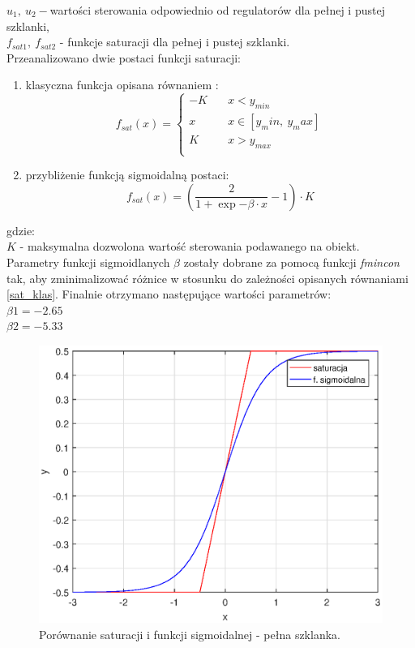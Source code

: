 $u_1, \ u_2 - $wartości sterowania odpowiednio od regulatorów dla pełnej i pustej szklanki,\\
$f_{sat1}, \ f_{sat2}$ - funkcje saturacji dla pełnej i pustej szklanki.
 \\
\newpage
 Przeanalizowano dwie postaci funkcji saturacji: 
 \begin{enumerate}
 	\item klasyczna funkcja opisana równaniem :
 	\begin{equation}\label{sat_klas}
 	f_{sat}(x) = 
 	\begin{cases}
 	-K       & \quad x < y_{min}\\
 	x  & \quad x \in [y_min, \ y_max]\\
 	K       & \quad x > y_{max}\\
 	\end{cases}
 	\end{equation}
 	\item przybliżenie funkcją sigmoidalną postaci:
 	\begin{equation}\label{key}
 	f_{sat}(x) = (\dfrac{2}{1+\exp{-\beta \cdot x}} - 1) \cdot K
 	\end{equation}
 \end{enumerate}
gdzie:\\
$K$ - maksymalna dozwolona wartość sterowania podawanego na obiekt.\\
Parametry funkcji sigmoidlanych $\beta$ zostały dobrane za pomocą funkcji \textit{fmincon} tak, aby zminimalizować różnice w stosunku do zależności opisanych równaniami \ref{sat_klas}. Finalnie otrzymano następujące wartości parametrów:\\
$\beta1 = -2.65$\\
$\beta2 = -5.33$\\

\begin{figure}[h!]
	\centering
	\includegraphics[scale = 0.8]{fig/por_sat_1.eps}
	\caption		
	{Porównanie saturacji i funkcji sigmoidalnej - pełna szklanka.}
	\label{por_sat1}
\end{figure} 

